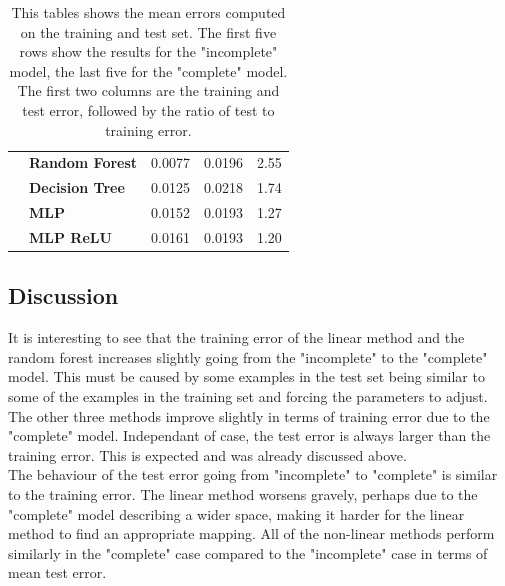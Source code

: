 \begin{table}[]
\begin{tabular}{l|l|l|l|l|}
\textbf{}           & \textbf{Random Forest} & 0.0077                                                                 & 0.0196                                                             & 2.55                                                                \\ \cline{2-5}
\textbf{}           & \textbf{Decision Tree} & 0.0125                                                                 & 0.0218                                                             & 1.74                                                                \\ \cline{2-5}
\textbf{}           & \textbf{MLP}           & 0.0152                                                                 & 0.0193                                                             & 1.27                                                                \\ \cline{2-5}
\textbf{}           & \textbf{MLP ReLU}      & 0.0161                                                                 & 0.0193                                                             & 1.20                                                                \\ \cline{2-5}
\end{tabular}
\caption[Learnt mapping results]{This tables shows the mean errors computed on the training and test set. The first five rows show the results for the "incomplete" model, the last five for the "complete" model. The first two columns are the training and test error, followed by the ratio of test to training error.}
\label{tableMapping}
\end{table}

\subsection{Discussion}
It is interesting to see that the training error of the linear method and the random forest increases slightly going from the "incomplete" to the "complete" model. This must be caused by some examples in the test set being similar to some of the examples in the training set and forcing the parameters to adjust. The other three methods improve slightly in terms of training error due to the "complete" model. Independant of case, the test error is always larger than the training error. This is expected and was already discussed above.\\

The behaviour of the test error going from "incomplete" to "complete" is similar to the training error. The linear method worsens gravely, perhaps due to the "complete" model describing a wider space, making it harder for the linear method to find an appropriate mapping. All of the non-linear methods perform similarly in the "complete" case compared to the "incomplete" case in terms of mean test error.\\

